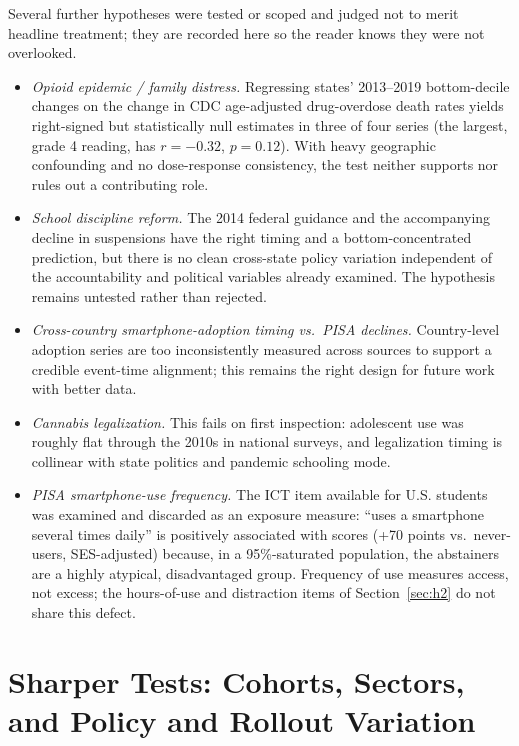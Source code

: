 \documentclass[11pt]{article}
\begin{document}
Several further hypotheses were tested or scoped and judged not to merit headline treatment; they are recorded here so the reader knows they were not overlooked.
\begin{itemize}
\item \emph{Opioid epidemic / family distress.} Regressing states' 2013--2019 bottom-decile changes on the change in CDC age-adjusted drug-overdose death rates yields right-signed but statistically null estimates in three of four series (the largest, grade 4 reading, has $r=-0.32$, $p=0.12$). With heavy geographic confounding and no dose-response consistency, the test neither supports nor rules out a contributing role.
\item \emph{School discipline reform.} The 2014 federal guidance and the accompanying decline in suspensions have the right timing and a bottom-concentrated prediction, but there is no clean cross-state policy variation independent of the accountability and political variables already examined. The hypothesis remains untested rather than rejected.
\item \emph{Cross-country smartphone-adoption timing vs.\ PISA declines.} Country-level adoption series are too inconsistently measured across sources to support a credible event-time alignment; this remains the right design for future work with better data.
\item \emph{Cannabis legalization.} This fails on first inspection: adolescent use was roughly flat through the 2010s in national surveys, and legalization timing is collinear with state politics and pandemic schooling mode.
\item \emph{PISA smartphone-use frequency.} The ICT item available for U.S. students was examined and discarded as an exposure measure: ``uses a smartphone several times daily'' is positively associated with scores (+70 points vs.\ never-users, SES-adjusted) because, in a 95\%-saturated population, the abstainers are a highly atypical, disadvantaged group. Frequency of use measures access, not excess; the hours-of-use and distraction items of Section~\ref{sec:h2} do not share this defect.
\end{itemize}

\section{Sharper Tests: Cohorts, Sectors, and Policy and Rollout Variation}
\label{sec:sharper}
\end{document}
